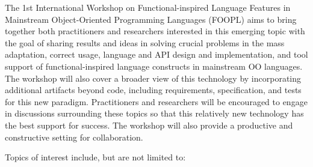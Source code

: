 \documentclass[10pt, conference]{IEEEtran}
\begin{document}
The 1st International Workshop on Functional-inspired Language Features in Mainstream Object-Oriented Programming Languages (FOOPL) aims to bring together both practitioners and researchers interested in this emerging topic with the goal of sharing results and ideas in solving crucial problems in the mass adaptation, correct usage, language and API design and implementation, and tool support of functional-inspired language constructs in mainstream OO languages.
The workshop will also cover a broader view of this technology by incorporating additional artifacts beyond code, including requirements, specification, and tests for this new paradigm. Practitioners and researchers will be encouraged to engage in
discussions surrounding these topics so that this relatively new technology has the best support for success. The workshop will also provide a productive and constructive setting for
collaboration.


Topics of interest include, but are not limited to:
\end{document}
